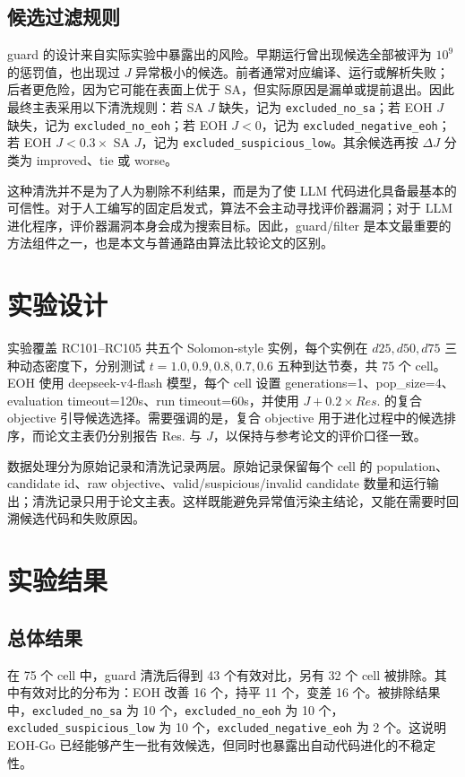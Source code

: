 \documentclass[UTF8,11pt]{ctexart}
\begin{document}
\subsection{候选过滤规则}
guard 的设计来自实际实验中暴露出的风险。早期运行曾出现候选全部被评为 $10^9$ 的惩罚值，也出现过 $J$ 异常极小的候选。前者通常对应编译、运行或解析失败；后者更危险，因为它可能在表面上优于 SA，但实际原因是漏单或提前退出。因此最终主表采用以下清洗规则：若 SA $J$ 缺失，记为 \texttt{excluded\_no\_sa}；若 EOH $J$ 缺失，记为 \texttt{excluded\_no\_eoh}；若 EOH $J<0$，记为 \texttt{excluded\_negative\_eoh}；若 EOH $J<0.3\times$ SA $J$，记为 \texttt{excluded\_suspicious\_low}。其余候选再按 $\Delta J$ 分类为 improved、tie 或 worse。

这种清洗并不是为了人为剔除不利结果，而是为了使 LLM 代码进化具备最基本的可信性。对于人工编写的固定启发式，算法不会主动寻找评价器漏洞；对于 LLM 进化程序，评价器漏洞本身会成为搜索目标。因此，guard/filter 是本文最重要的方法组件之一，也是本文与普通路由算法比较论文的区别。

\section{实验设计}
实验覆盖 RC101--RC105 共五个 Solomon-style 实例，每个实例在 $d25,d50,d75$ 三种动态密度下，分别测试 $t=1.0,0.9,0.8,0.7,0.6$ 五种到达节奏，共 75 个 cell。EOH 使用 deepseek-v4-flash 模型，每个 cell 设置 generations=1、pop\_size=4、evaluation timeout=120s、run timeout=60s，并使用 $J+0.2\times Res.$ 的复合 objective 引导候选选择。需要强调的是，复合 objective 用于进化过程中的候选排序，而论文主表仍分别报告 Res. 与 $J$，以保持与参考论文的评价口径一致。

数据处理分为原始记录和清洗记录两层。原始记录保留每个 cell 的 population、candidate id、raw objective、valid/suspicious/invalid candidate 数量和运行输出；清洗记录只用于论文主表。这样既能避免异常值污染主结论，又能在需要时回溯候选代码和失败原因。

\section{实验结果}
\subsection{总体结果}
在 75 个 cell 中，guard 清洗后得到 43 个有效对比，另有 32 个 cell 被排除。其中有效对比的分布为：EOH 改善 16 个，持平 11 个，变差 16 个。被排除结果中，\texttt{excluded\_no\_sa} 为 10 个，\texttt{excluded\_no\_eoh} 为 10 个，\texttt{excluded\_suspicious\_low} 为 10 个，\texttt{excluded\_negative\_eoh} 为 2 个。这说明 EOH-Go 已经能够产生一批有效候选，但同时也暴露出自动代码进化的不稳定性。
\end{document}
